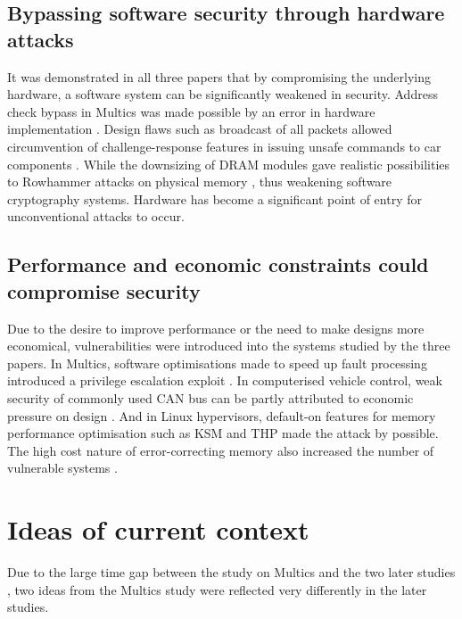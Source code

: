 \documentclass[11pt]{article}
\begin{document}
\subsection{Bypassing software security through hardware attacks}

It was demonstrated in all three papers that by compromising the underlying hardware, a software system can be significantly weakened in security. Address check bypass in Multics was made possible by an error in hardware implementation \cite[3.2.2]{karger1974multics}. Design flaws such as broadcast of all packets allowed circumvention of challenge-response features in issuing unsafe commands to car components \cite[V. B.]{koscher2010experimental}. While the downsizing of DRAM modules gave realistic possibilities to Rowhammer attacks on physical memory \cite[6.2]{razavi2016flip}, thus weakening software cryptography systems. Hardware has become a significant point of entry for unconventional attacks to occur.

\subsection{Performance and economic constraints could compromise security}

Due to the desire to improve performance or the need to make designs more economical, vulnerabilities were introduced into the systems studied by the three papers. In Multics, software optimisations made to speed up fault processing introduced a privilege escalation exploit \cite[3.3.2]{karger1974multics}. In computerised vehicle control, weak security of commonly used CAN bus can be partly attributed to economic pressure on design \cite[II. A.]{koscher2010experimental}. And in Linux hypervisors, default-on features for memory performance optimisation such as KSM and THP made the attack by \cite{razavi2016flip} possible. The high cost nature of error-correcting memory also increased the number of vulnerable systems \cite[6.1.1]{razavi2016flip}.

\section{Ideas of current context}

Due to the large time gap between the study on Multics \cite{karger1974multics} and the two later studies \cite{koscher2010experimental}\cite{razavi2016flip}, two ideas from the Multics study were reflected very differently in the later studies.
\end{document}
